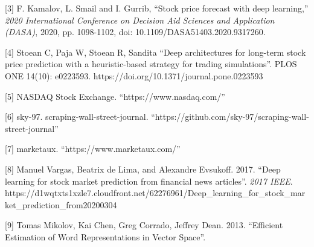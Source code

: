 \documentclass{article}
\begin{document}
[3] F. Kamalov, L. Smail and I. Gurrib, ``Stock price forecast with deep
learning,'' \textit{2020 International Conference on Decision Aid Sciences and
Application (DASA)}, 2020, pp. 1098-1102, doi: 10.1109/DASA51403.2020.9317260.

[4] Stoean C, Paja W, Stoean R, Sandita ``Deep architectures for long-term stock
price prediction with a heuristic-based strategy for trading simulations''. PLOS ONE 14(10): e0223593. https://doi.org/10.1371/journal.pone.0223593 

[5] NASDAQ Stock Exchange. ``https://www.nasdaq.com/''

[6] sky-97. scraping-wall-street-journal.
``https://github.com/sky-97/scraping-wall-street-journal''

[7] marketaux. ``https://www.marketaux.com/''

[8] Manuel Vargas, Beatrix de Lima, and Alexandre Evsukoff. 2017. ``Deep learning for
stock market prediction from financial news articles''. \textit{2017 IEEE}.
https://d1wqtxts1xzle7.cloudfront.net/62276961/Deep\_learning\_for\_stock\_market\_prediction\_from20200304

[9] Tomas Mikolov, Kai Chen, Greg Corrado, Jeffrey Dean. 2013. ``Efficient
Estimation of Word Representations in Vector Space''.
\end{document}
